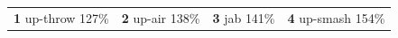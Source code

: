 {\small\begin{tabularx}{\linewidth}{ZZZZ}
\textbf{1} up-throw {\color{black!55}127\%} & \textbf{2} up-air {\color{black!55}138\%} & \textbf{3} jab {\color{black!55}141\%} & \textbf{4} up-smash {\color{black!55}154\%}
\end{tabularx}}
